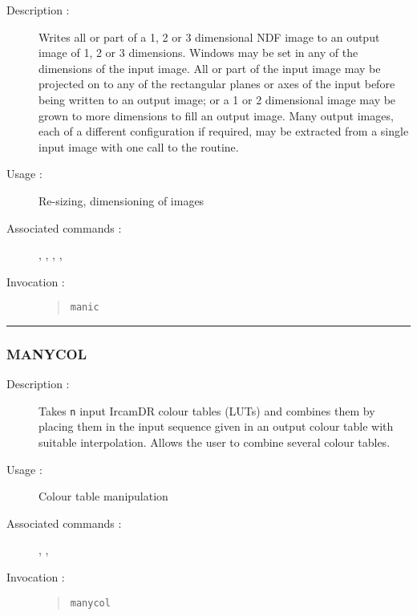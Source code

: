 \begin{description}

\item[Description :] Writes all or part of a 1, 2 or 3 dimensional
NDF image to an output image of 1, 2 or 3 dimensions. Windows may be
set in any of the dimensions of the input image. All or part of the
input image may be projected on to any of the rectangular planes or
axes of the input before being written to an output image; or a 1 or 2
dimensional image may be grown to more dimensions to fill an output
image. Many output images, each of a different configuration if
required, may be extracted from a single input image with one call to
the routine.

\item[Usage :] Re-sizing, dimensioning of images

\item[Associated commands :] {\tt {}}, 
{\tt {}}, {\tt {}}, 
{\tt {}}, {\tt {}}

\item[Invocation :]

\begin{quote}{\tt  manic }\end{quote}

\end{description}

\hrule 
\subsubsection*{\label{MANYCOL}MANYCOL}

\begin{description}

\item[Description :] Takes {\tt n} input {\sc IrcamDR} colour tables
(LUTs) and combines them by placing them in the input sequence given in
an output colour table with suitable interpolation.  Allows the user to
combine several colour tables.

\item[Usage :] Colour table manipulation
\item[Associated commands :] {\tt {}}, 
{\tt {}}, {\tt {}}
\item[Invocation :]

\begin{quote}{\tt  manycol }\end{quote}

\end{description}

